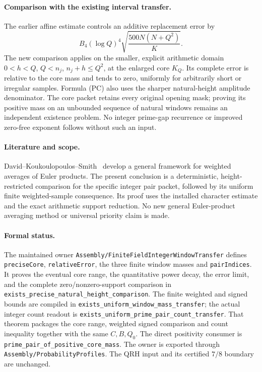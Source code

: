 \documentclass[11pt]{article}
\begin{document}
\paragraph{Comparison with the existing interval transfer.}
The earlier affine estimate controls an additive replacement error by
\[
 B_4(\log Q)^4
    \sqrt{\frac{500N(N+Q^2)}{K}}.
\]
The new comparison applies on the smaller, explicit arithmetic domain
\(0<h<Q\), \(Q<n_j\), \(n_j+h\leq Q^2\), at the enlarged core \(K_Q\).
Its complete error is relative to the core mass and tends to zero,
uniformly for arbitrarily short or irregular samples. Formula (PC)
also uses the sharper natural-height amplitude denominator.
The core packet retains every original opening mask; proving its
positive mass on an unbounded sequence of natural windows remains
an independent existence problem. No integer prime-gap recurrence
or improved zero-free exponent follows without such an input.

\paragraph{Literature and scope.}
David--Koukoulopoulos--Smith~\cite{DavidKoukoulopoulosSmith}
develop a general framework for weighted averages of Euler products.
The present conclusion is a deterministic, height-restricted comparison
for the specific integer pair packet, followed by its uniform finite
weighted-sample consequence. Its proof uses the installed character
estimate and the exact arithmetic support reduction. No new general
Euler-product averaging method or universal priority claim is made.

\paragraph{Formal status.}
The maintained owner
\texttt{Assembly/FiniteFieldIntegerWindowTransfer}
defines \texttt{preciseCore}, \texttt{relativeError}, the three
finite window masses and \texttt{pairIndices}. It proves the
eventual core range, the quantitative power decay, the error limit,
and the complete zero/nonzero-support comparison in
\texttt{exists\_precise\_natural\_height\_comparison}.
The finite weighted and signed bounds are compiled in
\texttt{exists\_uniform\_window\_mass\_transfer};
the actual integer count readout is
\texttt{exists\_uniform\_prime\_pair\_count\_transfer}.
That theorem packages the core range, weighted signed comparison and
count inequality together with the same \(C,B,Q_0\).
The direct positivity consumer is
\texttt{prime\_pair\_of\_positive\_core\_mass}.
The owner is exported through
\texttt{Assembly/ProbabilityProfiles}.
The QRH input and its certified \(7/8\) boundary are unchanged.
\end{document}
